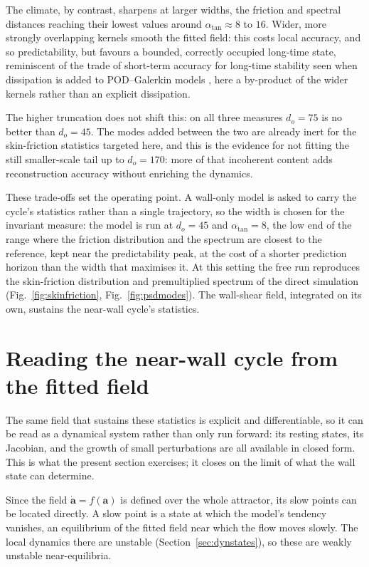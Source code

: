 \documentclass[pdflatex,sn-basic]{sn-jnl}
\newcommand{\bfa}{\bm{a}}
\theoremstyle{thmstyleone}%
\theoremstyle{thmstyletwo}%
\theoremstyle{thmstylethree}%
\begin{document}
The climate, by contrast, sharpens at larger widths, the friction and spectral distances reaching
their lowest values around $\alpha_{\mathrm{tan}}\approx 8$ to $16$. Wider, more strongly
overlapping kernels smooth the fitted field: this costs local accuracy, and so predictability,
but favours a bounded, correctly occupied long-time state, reminiscent of the trade of short-term
accuracy for long-time stability seen when dissipation is added to POD--Galerkin models
\citep{Aubry_Holmes_Lumley_Stone_1988,rempfer2000low}, here a by-product of the wider kernels
rather than an explicit dissipation.

The higher truncation does not shift this: on all three measures $d_o=75$ is no better than
$d_o=45$. The modes added between the two are already inert for the skin-friction statistics targeted here,
and this is the evidence for not fitting the still smaller-scale tail up to $d_o=170$: more of
that incoherent content adds reconstruction accuracy without enriching the dynamics.

These trade-offs set the operating point. A wall-only model is asked to carry the cycle's
statistics rather than a single trajectory, so the width is chosen for the invariant measure: the
model is run at $d_o=45$ and $\alpha_{\mathrm{tan}}=8$, the low end of the range where the friction
distribution and the spectrum are closest to the reference, kept near the predictability peak, at
the cost of a shorter prediction horizon than the width that maximises it. At this setting the free run reproduces the
skin-friction distribution and premultiplied spectrum of the direct simulation
(Fig.~\ref{fig:skinfriction}, Fig.~\ref{fig:psdmodes}). The wall-shear field, integrated on its
own, sustains the near-wall cycle's statistics.

\section{Reading the near-wall cycle from the fitted field}\label{sec:interp}

The same field that sustains these statistics is explicit and differentiable, so it can be read
as a dynamical system rather than only run forward: its resting states, its Jacobian,
and the growth of small perturbations are all available in closed form. This is what the
present section exercises; it closes on the limit of what the wall state can determine.

Since the field $\dot{\bfa}=f(\bfa)$ is defined over the whole attractor, its slow points
can be located directly. A slow point is a state at which the model's tendency vanishes,
an equilibrium of the fitted field near which the flow moves slowly. The local dynamics
there are unstable (Section~\ref{sec:dynstates}), so these are weakly unstable
near-equilibria. 
\end{document}
